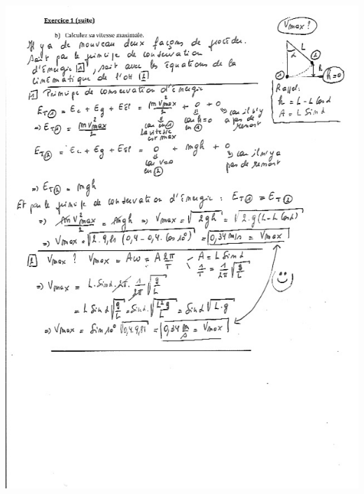  \includegraphics[width=15cm]{COURS2EnergieOHEXERCRESOL-img/COURS2EnergieOHEXERCRESOL-img008.png} 


